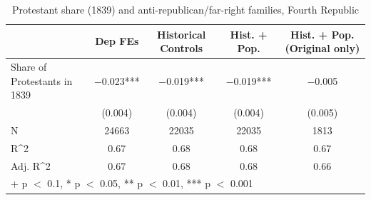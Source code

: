 \begin{table}
\centering
\caption{Protestant share (1839) and anti-republican/far-right families, Fourth Republic}
\centering
\begin{tabular}[t]{lcccc}
\toprule
  & Dep FEs & Historical Controls & Hist. + Pop. & Hist. + Pop. (Original only)\\
\midrule
Share of Protestants in 1839 & \num{-0.023}*** & \num{-0.019}*** & \num{-0.019}*** & \num{-0.005}\\
 & (\num{0.004}) & (\num{0.004}) & (\num{0.004}) & (\num{0.005})\\
\midrule
N & \num{24663} & \num{22035} & \num{22035} & \num{1813}\\
R\textasciicircum{}2 & \num{0.67} & \num{0.68} & \num{0.68} & \num{0.67}\\
Adj. R\textasciicircum{}2 & \num{0.67} & \num{0.68} & \num{0.68} & \num{0.66}\\
\bottomrule
\multicolumn{5}{l}{\rule{0pt}{1em}+ p $<$ 0.1, * p $<$ 0.05, ** p $<$ 0.01, *** p $<$ 0.001}\\
\end{tabular}
\end{table}
